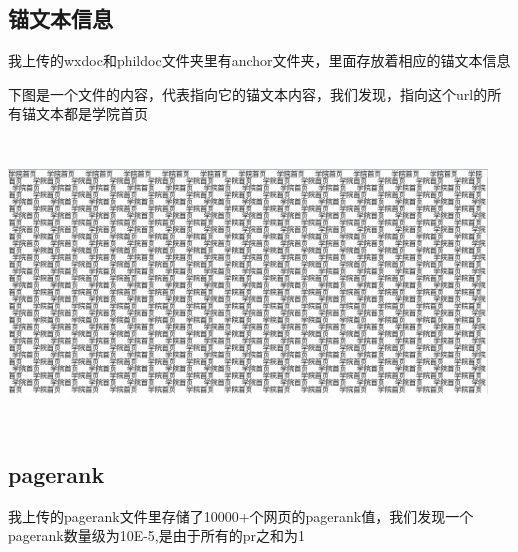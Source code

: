 ﻿\documentclass[UTF8]{ctexart}
\begin{document}
\begin{flushleft}
\subsection{锚文本信息}
我上传的wxdoc和phildoc文件夹里有anchor文件夹，里面存放着相应的锚文本信息
\par{}
下图是一个文件的内容，代表指向它的锚文本内容，我们发现，指向这个url的所有锚文本都是学院首页
\par{}
\includegraphics[width=5.00in,height=3.00in]{figure33.jpg}
\par{}
\subsection{pagerank}
我上传的pagerank文件里存储了10000+个网页的pagerank值，我们发现一个pagerank数量级为10E-5,是由于所有的pr之和为1

\end{flushleft}
\end{document}
